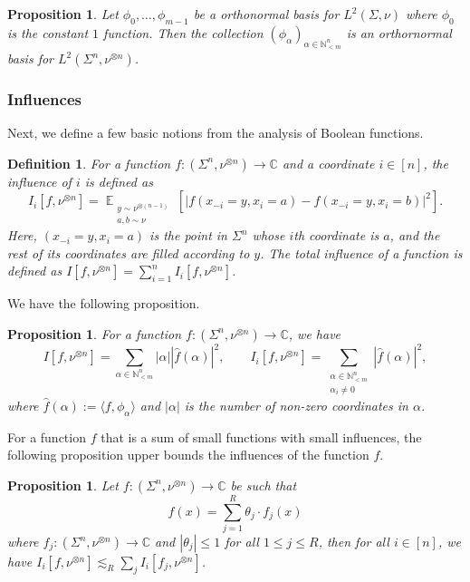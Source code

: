 \documentclass[11pt]{article}
\newtheorem{definition}[thm]{Definition}
\newtheorem{proposition}[thm]{Proposition}
\newcommand\card[1]{\left| {#1} \right|}
\newcommand\Expect[2]{{\mathop{\mathbb{E}}_{#1}\left[ {#2} \right]}}
\renewcommand\leq{\leqslant}
\begin{document}
\begin{proposition}\label{prop:fourier_n}
	Let $\phi_0, \dots, \phi_{m-1}$ be a orthonormal basis for $L^2(\Sigma, \nu)$ where $\phi_0$ is the constant $1$ function. Then the collection $(\phi_{\alpha})_{\alpha \in \mathbb{N}^n_{<m}}$ is an orthornormal basis for $L^2(\Sigma^n, \nu^{\otimes n})$.
\end{proposition}
\subsubsection{Influences}

Next, we define a few basic notions from the analysis of Boolean functions.
\begin{definition}\label{def:influence}
	For a function $f\colon (\Sigma^n,\nu^{\otimes n})\to\mathbb{C}$ and a coordinate $i\in [n]$, the influence of
	$i$ is defined as
	\[
	I_i[f, \nu^{\otimes n}] = \Expect{\substack{y\sim \nu^{\otimes (n-1)}\\a,b\sim \nu}}{\card{f(x_{-i} = y, x_i = a)-f(x_{-i} = y, x_i = b)}^2}.
	\]
    Here, $(x_{-i} = y, x_i = a)$ is the point in $\Sigma^n$ whose $i$th coordinate is $a$, and the rest of its coordinates are filled according to $y$.
	The total influence of a function is defined as $I[f, \nu^{\otimes n}] = \sum_{i=1}^n I_i[f, \nu^{\otimes n}]$.
\end{definition}
We have the following proposition.
\begin{proposition}\label{prop:total_inf}
	For a function $f\colon (\Sigma^n,\nu^{\otimes n})\to\mathbb{C}$, we have
	\[
    I[f, \nu^{\otimes n}] = \sum_{\alpha \in \mathbb{N}^n_{<m}} \card{\alpha}\card{\hat{f}(\alpha)}^2,\quad\quad I_i[f, \nu^{\otimes n}]  = \sum_{\substack{\alpha \in \mathbb{N}^{n}_{<m}\\ \alpha_i \neq 0}} \card{\hat{f}(\alpha)}^2,
    \]
	where $\hat{f}(\alpha) := \langle f, \phi_\alpha\rangle$ and $\card{\alpha}$ is the number of non-zero coordinates in $\alpha$.
\end{proposition}
For a function $f$ that is a sum of small functions with small influences, the following proposition upper bounds the influences of the function $f$.
\begin{proposition}
    \label{prop:sum_inf}
    Let $f\colon (\Sigma^n,\nu^{\otimes n})\to\mathbb{C}$ be such that 
    $$f(x) = \sum_{j=1}^{R} \theta_j \cdot 
    f_j(x)$$
    where $f_j\colon (\Sigma^n,\nu^{\otimes n})\to\mathbb{C}$ and $|\theta_j|\leq 1$ for all $1\leq j\leq R$, then for all $i\in [n]$, we have $I_i[f, \nu^{\otimes n}] \lesssim_R \sum_{j}I_i[f_j, \nu^{\otimes n}]$.
\end{proposition}
\end{document}
